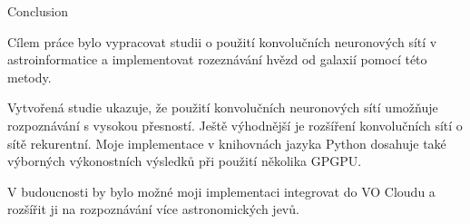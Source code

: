 \chap Conclusion

Cílem práce bylo vypracovat studii o použití konvolučních neuronových sítí v
astroinformatice a implementovat rozeznávání hvězd od galaxií pomocí této
metody.

Vytvořená studie ukazuje, že použití konvolučních neuronových sítí umožňuje
rozpoznávání s vysokou přesností. Ještě výhodnější je rozšíření konvolučních
sítí o sítě rekurentní. Moje implementace v knihovnách jazyka Python dosahuje
také výborných výkonostních výsledků při použití několika GPGPU.

V budoucnosti by bylo možné moji implementaci integrovat do VO Cloudu
a rozšířit ji na rozpoznávání více astronomických jevů.
